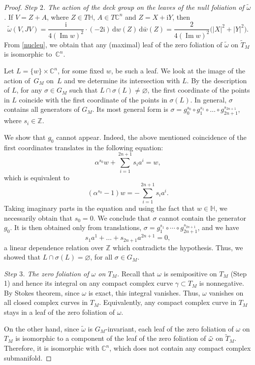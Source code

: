 \documentclass[pdftex]{sigma}
\renewcommand{\H}{{\mathbb H}}
\newcommand{\6}{\partial}
\renewcommand{\Im}{\operatorname{Im}}
\numberwithin{equation}{section}
\begin{document}
\begin{proof}
{\it Step $2$. The action of the deck group on the leaves of the null foliation of $\tilde\omega$.}
 If $V=Z+A$, where $Z \in T\mathbb{H}$, $A \in T\mathbb{C}^n$ and $Z=X+\mathrm{i}Y$, then
\begin{equation} \label{nucleu}
\tilde{\omega}(V, JV) = \frac{\mathrm{i}}{4 (\Im w)^2} \cdot (-2\mathrm{i}) \, \mathrm{d}w(Z) \, \mathrm{d}\bar{w}(Z) = \frac{2}{4 (\Im w)^2} \big(|X|^2 + |Y|^2\big).
\end{equation}
 From \eqref{nucleu}, we obtain that any (maximal) leaf of the zero foliation of $\tilde{\omega}$ on $\tilde T_M$ is isomorphic to~$\mathbb{C}^n$.


Let $L=\{w\} \times \mathbb{C}^n$, for some fixed $w$, be such a leaf. We look at the image of the action of~$G_M$ on~$L$ and we determine its intersection with $L$.
By the description of $L$, for any $\sigma \in G_M$ such that $L \cap \sigma(L) \neq \varnothing$, the first coordinate of the points in $L$ coincide with the first coordinate of the points in $\sigma(L)$.
In general, $\sigma$ contains all generators of $G_M$. Its most general form is $\sigma=g_0^{s_0} \circ g_1^{s_1}\circ \dots \circ g_{2n+1}^{s_{2n+1}}$, where $s_i \in \mathbb{Z}$.

We show that $g_0$ cannot appear.
Indeed, the above mentioned coincidence of the first coordinates translates in the following equation:
\begin{equation*}
\alpha^{s_0}w+\sum_{i=1}^{2n+1} s_i a^i=w,
\end{equation*}
which is equivalent to
\begin{equation*}
(\alpha^{s_0}-1)w=-\sum_{i=1} ^{2n+1} s_i a^i.
\end{equation*}
Taking imaginary parts in the equation and using the fact that $w \in \H$, we necessarily obtain that $s_0=0$.
We conclude that $\sigma$ cannot contain the generator $g_0$. It is then obtained only from translations, $\sigma=g_1^{s_1}\circ \cdots \circ g_{2n+1}^{s_{2n+1}}$, and we have
\begin{equation*}
s_1 a^1+ \dots +s_{2n+1} a^{2n+1}=0,
\end{equation*}
a linear dependence relation over $\mathbb{Z}$ which contradicts the hypothesis.
Thus, we showed that $L \cap \sigma(L) = \varnothing$, for all $\sigma \in G_M$.

{\it Step $3$. The zero foliation of $\omega$ on $T_M$.}
Recall that $\omega$ is semipositive on $T_M$ (Step 1) and hence its integral on any compact complex curve $\gamma \subset T_M$ is nonnegative. By Stokes theorem, since $\omega$ is exact, this integral vanishes. Thus, $\omega$ vanishes on all closed complex curves in $T_M$. Equivalently, any compact complex curve in $T_M$ stays in a leaf of the zero foliation of $\omega$.

On the other hand, since $\tilde{\omega}$ is $G_M$-invariant, each leaf of the zero foliation of $\omega$ on $T_M$ is isomorphic to a component of the leaf of the zero foliation of $\Tilde{\omega}$ on $\tilde T_M$. Therefore, it is isomorphic with $\mathbb{C}^n$, which does not contain any compact complex submanifold.
\end{proof}
\end{document}
